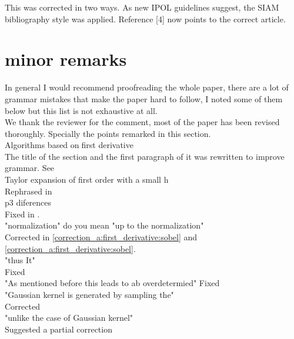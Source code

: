 \documentclass[a4paper,10pt]{report}
\begin{document}
\ans This was corrected in two ways. As new IPOL guidelines suggest, the SIAM bibliography style was applied. Reference [4] now points to the correct article.\\

\section{minor remarks}

\que In general I would recommend proofreading the whole paper, there are a lot of grammar
mistakes that make the paper hard to follow, I noted some of them below but this list is not exhaustive at all.\\

\ans We thank the reviewer for the comment, most of the paper has been revised thoroughly. Specially the points remarked in this section.\\

\que Algorithms based onfirst derivative \\
\ans The title of the section and the first paragraph of it was rewritten to improve grammar. See  \\

\que Taylor expansion of first order with a small h\\

\ans Rephrased in \\

\que p3 diferences\\

\ans Fixed in . \\

\que "normalization" do you mean "up to the normalization"\\

\ans Corrected in \ref{correction_a:first_derivative:sobel} and \ref{correction_a:first_derivative:sobel}.\\

\que "thus It"\\

\ans Fixed\\

\que "As mentioned before this leads to ab overdetermied"
\ans Fixed\\ 

\que "Gaussian kernel is generated by sampling the"\\
\ans Corrected\\
\que "unlike the case of Gaussian kernel"\\
\ans Suggested a partial correction\\
\end{document}
